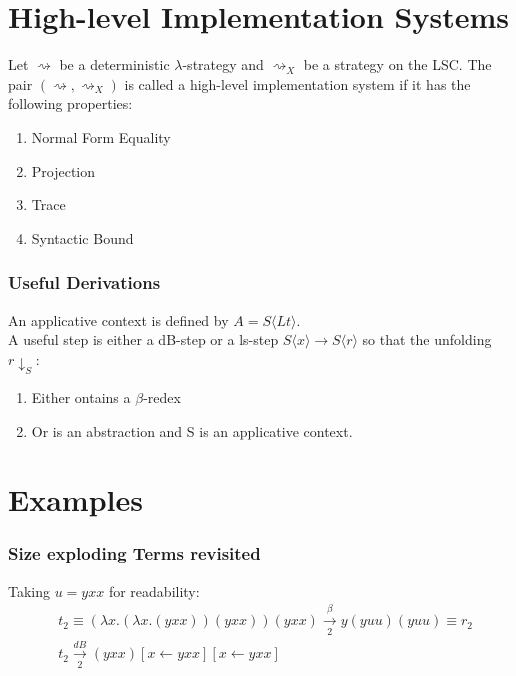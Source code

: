 \documentclass{beamer}
\begin{document}
\section{High-level Implementation Systems}
\begin{frame}
  Let $\rightsquigarrow$ be a deterministic $\lambda$-strategy and $\rightsquigarrow_{X}$ be a strategy on the LSC. The pair $(\rightsquigarrow , \rightsquigarrow_{X})$ is called a high-level implementation system if it has the following properties:
  \begin{enumerate}
    \item Normal Form Equality
    \item Projection
    \item Trace
    \item Syntactic Bound
  \end{enumerate}
\end{frame}
\begin{frame}
  \frametitle{Useful Derivations}
  An applicative context is defined by $A = S\langle Lt \rangle$. \\
  A useful step is either a dB-step or a ls-step $S \langle x \rangle \rightarrow S \langle r \rangle$ so that the unfolding $r \downarrow_{S}$:
  \begin{enumerate}
          \item Either ontains a $\beta$-redex
          \item Or is an abstraction and S is an applicative context.
  \end{enumerate}
\end{frame}
\section{Examples}
\begin{frame}
  \frametitle{Size exploding Terms revisited}
  Taking $u = yxx$ for readability:
  \begin{equation}
    \begin{split}
  & t_{2} \equiv (\lambda x.(\lambda x . (yxx))(yxx))(yxx) \xrightarrow[2]{\beta} y(yuu)(yuu) \equiv r_{2} \\
  & t_{2} \xrightarrow[2]{dB} (yxx)[x \leftarrow yxx][x \leftarrow yxx]
    \end{split}
  \end{equation}
\end{frame}
\end{document}

